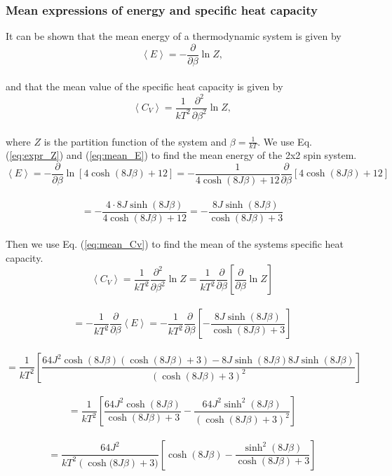 \documentclass[12pt]{article}
\begin{document}
\begin{flushleft}
\subsubsection{Mean expressions of energy and specific heat capacity}
It can be shown that the mean energy of a thermodynamic	system is given by
\vspace{5mm}
\begin{equation}\label{eq:mean_E}
\left< E \right> = -\frac{\partial }{\partial \beta}\ln Z,
\end{equation}\\
\vspace{5mm}
and that the mean value of the specific heat capacity is given by
\vspace{5mm}
\begin{equation}\label{eq:mean_Cv}
\left< C_V\right> = \frac{1}{kT^2}\frac{\partial^2}{\partial\beta^2}\ln Z,
\end{equation}\\
\vspace{5mm}
where $Z$ is the partition function of the system and $\beta = \frac{1}{kT}$.
We use Eq. (\ref{eq:expr_Z}) and (\ref{eq:mean_E}) to find the mean energy of the 2x2 spin system.
\vspace{5mm}
$$\left< E \right> = -\frac{\partial}{\partial\beta}\ln \left[ 4\cosh(8J\beta) + 12 \right] = -\frac{1}{4\cosh(8J\beta) + 12}\frac{\partial}{\partial\beta}\left[4\cosh(8J\beta) + 12\right]$$\\
\vspace{5mm}
$$ = -\frac{4\cdot 8J\sinh(8J\beta)}{4\cosh(8J\beta) + 12} = -\frac{8J\sinh(8J\beta)}{\cosh(8J\beta) + 3}$$\\
\vspace{5mm}
Then we use Eq. (\ref{eq:mean_Cv}) to find the mean of the systems specific heat capacity.
\vspace{5mm}
$$\left<C_V\right> = \frac{1}{kT^2}\frac{\partial^2}{\partial\beta^2}\ln Z = \frac{1}{kT^2}\frac{\partial}{\partial\beta}\left[\frac{\partial}{\partial\beta}\ln Z\right]$$\\
\vspace{5mm} 
$$ = -\frac{1}{kT^2}\frac{\partial}{\partial\beta}\left< E\right> = -\frac{1}{kT^2}\frac{\partial}{\partial\beta}\left[-\frac{8J\sinh(8J\beta)}{\cosh(8J\beta) + 3}\right]$$\\
\vspace{10mm}
$$ = \frac{1}{kT^2} \left[\frac{64J^2\cosh(8J\beta)\left(\cosh(8J\beta) + 3\right) - 8J\sinh(8J\beta)8J\sinh(8J\beta)}{\left(\cosh(8J\beta) + 3\right)^2}\right]$$\\
\vspace{5mm}
\newpage
$$ = \frac{1}{kT^2} \left[\frac{64J^2\cosh(8J\beta)}{\cosh(8J\beta) + 3} - \frac{64J^2\sinh^2(8J\beta)}{\left(\cosh(8J\beta) + 3\right)^2}\right]$$\\
\vspace{5mm}
$$ = \frac{64J^2}{kT^2\left(\cosh(8J\beta\right) + 3)}\left[\cosh(8J\beta) - \frac{\sinh^2(8J\beta)}{\cosh(8J\beta) + 3}\right]$$\\
\vspace{5mm}

\end{flushleft}
\end{document}
